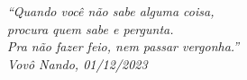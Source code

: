 \begin{epigrafe}
  \vspace*{\fill}
  \begin{flushright}
    \textit{``Quando você não sabe alguma coisa,\\
      procura quem sabe e pergunta.\\
      Pra não fazer feio, nem passar vergonha.''\\
      Vovô Nando, 01/12/2023}
  \end{flushright}
\end{epigrafe}